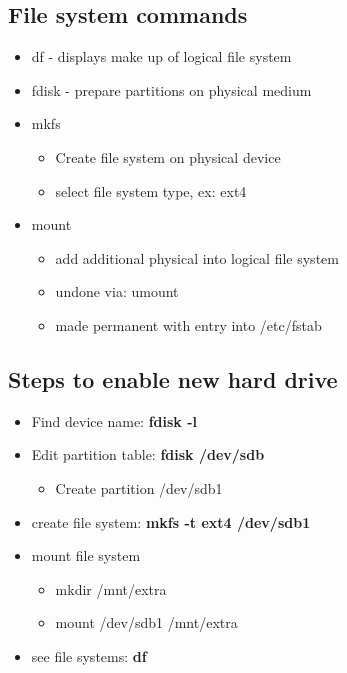 \documentclass{report}
\begin{document}
    \bigbreak \noindent 
    \subsection{File system commands}
    \begin{itemize}
        \item df - displays make up of logical file system
        \item fdisk - prepare partitions on physical medium
        \item mkfs
            \begin{itemize}
                \item Create file system on physical device 
                \item select file system type, ex: ext4
            \end{itemize}
        \item mount
            \begin{itemize}
                \item add additional physical into logical file system
                \item undone via: umount
                \item made permanent with entry into /etc/fstab
            \end{itemize}
    \end{itemize}

    \bigbreak \noindent 
    \subsection{Steps to enable new hard drive}
    \begin{itemize}
        \item Find device name: \textbf{fdisk -l}
        \item Edit partition table: \textbf{fdisk /dev/sdb}
            \begin{itemize}
                \item Create partition /dev/sdb1
            \end{itemize}
        \item create file system: \textbf{mkfs -t ext4 /dev/sdb1}
        \item mount file system
            \begin{itemize}
                \item mkdir /mnt/extra
                \item mount /dev/sdb1 /mnt/extra
            \end{itemize}
        \item see file systems: \textbf{df}
    \end{itemize}
    
\end{document}
